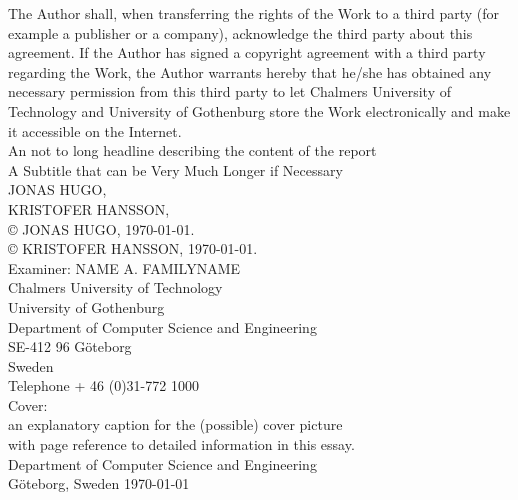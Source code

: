\begin{titlepage}
\begin{flushleft}
{{The Author shall, when transferring the rights of the Work to a third party (for example a publisher or a company), acknowledge the third party about this agreement. If the Author has signed a copyright agreement with a third party regarding the Work, the Author warrants hereby that he/she has obtained any necessary permission from this third party to let Chalmers University of Technology and University of Gothenburg  store the Work electronically and make it accessible on the Internet.\\[2cm]

An not to long headline describing the content of the report \\
A Subtitle that can be Very Much Longer if Necessary\\

JONAS HUGO, \\
KRISTOFER HANSSON, \\[0.8cm]

© JONAS HUGO, \mydate\today.\\
© KRISTOFER HANSSON, \mydate\today.\\[0.5cm]

Examiner: NAME A. FAMILYNAME\\[0.5cm]

Chalmers University of Technology\\
University of Gothenburg\\
Department of Computer Science and Engineering\\
SE-412 96 Göteborg\\
Sweden\\
Telephone + 46 (0)31-772 1000\\[0.8cm]

Cover:\\
an explanatory caption for the (possible) cover picture\\
with page reference to detailed information in this essay.\\[0.5cm]

Department of Computer Science and Engineering\\
Göteborg, Sweden \mydate\today

    }
    }

\end{flushleft}

\end{titlepage}

\pagestyle{empty}
\newpage
\clearpage
\mbox{}
\newpage
\clearpage
\thispagestyle{empty}

